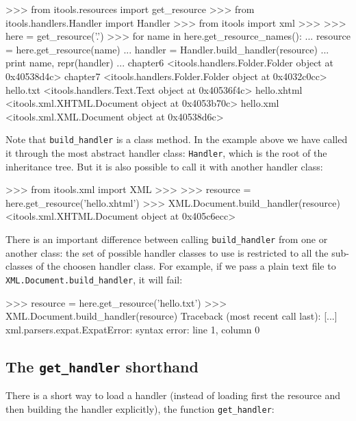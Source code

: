 \begin{code}
    >>> from itools.resources import get_resource
    >>> from itools.handlers.Handler import Handler
    >>> from itools import xml
    >>> 
    >>> here = get_resource('.')
    >>> for name in here.get_resource_names():
    ...     resource = here.get_resource(name)
    ...     handler = Handler.build_handler(resource)
    ...     print name, repr(handler)
    ... 
    chapter6 <itools.handlers.Folder.Folder object at 0x40538d4c>
    chapter7 <itools.handlers.Folder.Folder object at 0x4032c0cc>
    hello.txt <itools.handlers.Text.Text object at 0x40536f4c>
    hello.xhtml <itools.xml.XHTML.Document object at 0x4053b70c>
    hello.xml <itools.xml.XML.Document object at 0x40538d6c>
\end{code}

Note that {\tt build\_handler} is a class method. In the example above
we have called it through the most abstract handler class: {\tt Handler},
which is the root of the inheritance tree. But it is also possible to call
it with another handler class:

\begin{code}
    >>> from itools.xml import XML
    >>> 
    >>> resource = here.get_resource('hello.xhtml')
    >>> XML.Document.build_handler(resource)
    <itools.xml.XHTML.Document object at 0x405c6ecc>
\end{code}

There is an important difference between calling {\tt build\_handler} from
one or another class: the set of possible handler classes to use is
restricted to all the sub-classes of the choosen handler class. For example,
if we pass a plain text file to {\tt XML.Document.build\_handler}, it will
fail:

\begin{code}
    >>> resource = here.get_resource('hello.txt')
    >>> XML.Document.build_handler(resource)
    Traceback (most recent call last):
      [...]
    xml.parsers.expat.ExpatError: syntax error: line 1, column 0
\end{code}


\subsection{The {\tt get\_handler} shorthand}

There is a short way to load a handler (instead of loading first the resource
and then building the handler explicitly), the function {\tt get\_handler}:

